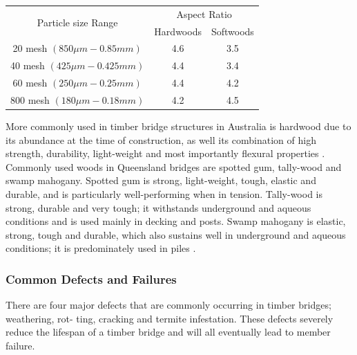 \documentclass[11pt,a4paper]{article}
\numberwithin{equation}{subsection}
\begin{document}
	\pagebreak
	\begin{center}
		\label{tab:Aspect}
		\begin{tabular}{c c c} 
			\hline
			\multirow{2}{*}{Particle size Range} & \multicolumn{2}{c}{Aspect Ratio} \\
			\cline{2-3}
			
			& Hardwoods & Softwoods \\ [0.5ex] 
			\hline
			20 mesh $(850\mu m - 0.85mm)$ & 4.6 & 3.5 \\ [0.5ex]
			
			40 mesh $(425\mu m - 0.425mm)$ & 4.4 & 3.4 \\ [0.5ex]
			
			60 mesh $(250\mu m - 0.25mm)$ & 4.4 & 4.2 \\ [0.5ex]
			
			800 mesh $(180\mu m - 0.18mm)$ & 4.2 & 4.5 \\ [0.5ex]
			
			\hline
			
		\end{tabular}
	\end{center}
	
	\vspace*{\baselineskip}
	
	\noindent
	More commonly used in timber bridge structures in Australia is hardwood due to its abundance at the time of construction\cite{rta_timber_2000}, as well its combination of high strength, durability, light-weight and most importantly flexural properties \cite{klyosov_wood-plastic_2007}. Commonly used woods in Queensland bridges are spotted gum, tally-wood and swamp mahogany. Spotted gum is strong, light-weight, tough, elastic and durable, and is particularly well-performing when in tension. Tally-wood is strong, durable and very tough; it withstands underground and aqueous conditions and is used mainly in decking and posts. Swamp mahogany is elastic, strong, tough and durable, which also sustains well in underground and aqueous conditions; it is predominately used in piles \cite{_queensland_1899}.
	
	\subsubsection{Common Defects and Failures}
    There are four major defects that are commonly occurring in timber bridges; weathering, rot- ting, cracking and termite infestation. These defects severely reduce the lifespan of a timber bridge and will all eventually lead to member failure.
\end{document}
